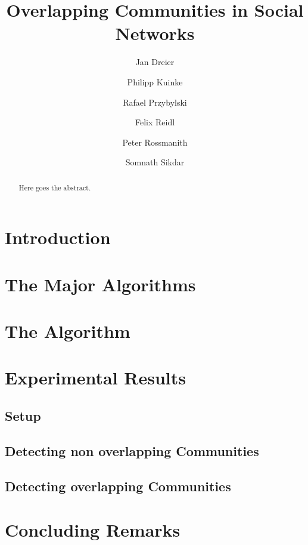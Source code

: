 \documentclass[12pt]{article}
\title{Overlapping Communities in Social Networks}
\author{Jan Dreier 
\and Philipp Kuinke 
\and Rafael Przybylski 
\and Felix Reidl 
\and Peter Rossmanith 
\and Somnath Sikdar}
\date{}
\begin{document}
\maketitle

\begin{abstract}
Here goes the abstract.
\end{abstract}

\section{Introduction}


\section{The Major Algorithms} \label{sec:major_algorithms}


\section{The Algorithm} \label{sec:algorithm}


\section{Experimental Results} \label{sec:experiments}

\subsection{Setup}


\subsection{Detecting non overlapping Communities}


\subsection{Detecting overlapping Communities}


\section{Concluding Remarks} \label{sec:conclusions}

\def\redefineme{
    \def\LNCS{LNCS}%
    \def\ICALP##1{Proc. of ##1 ICALP}%
    \def\FOCS##1{Proc. of ##1 FOCS}%
    \def\COCOON##1{Proc. of ##1 COCOON}%
    \def\SODA##1{Proc. of ##1 SODA}%
    \def\SWAT##1{Proc. of ##1 SWAT}%
    \def\IWPEC##1{Proc. of ##1 IWPEC}%
    \def\IWOCA##1{Proc. of ##1 IWOCA}%
    \def\ISAAC##1{Proc. of ##1 ISAAC}%
    \def\STACS##1{Proc. of ##1 STACS}%
    \def\ESA##1{Proc. of ##1 ESA}%
    \def\WG##1{Proc. of ##1 WG}%
    \def\LIPIcs##1{LIPIcs}%
    \def\LIPIcs{LIPIcs}%
    \def\LICS##1{Proc. of ##1 LICS}%
}



\end{document}
